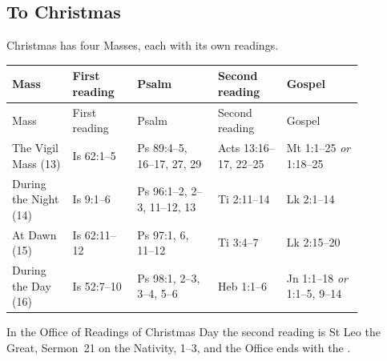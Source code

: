 \subsection{To Christmas}

Christmas has four Masses, each with its own readings.

{\footnotesize
\setlength{\tabcolsep}{4pt}
\begin{longtable}{@{}>{\raggedright\arraybackslash}p{0.15\linewidth}>{\raggedright\arraybackslash}p{0.16\linewidth}>{\raggedright\arraybackslash}p{0.20\linewidth}>{\raggedright\arraybackslash}p{0.17\linewidth}>{\raggedright\arraybackslash}p{0.19\linewidth}@{}}
\toprule
Mass & First reading & Psalm & Second reading & Gospel\\
\midrule
\endfirsthead
\toprule
Mass & First reading & Psalm & Second reading & Gospel\\
\midrule
\endhead
The Vigil Mass (13) & Is 62:1--5 & Ps 89:4--5, 16--17, 27, 29 & Acts 13:16--17, 22--25 & Mt 1:1--25 \textit{or} 1:18--25\\
\addlinespace
During the Night (14) & Is 9:1--6 & Ps 96:1--2, 2--3, 11--12, 13 & Ti 2:11--14 & Lk 2:1--14\\
\addlinespace
At Dawn (15) & Is 62:11--12 & Ps 97:1, 6, 11--12 & Ti 3:4--7 & Lk 2:15--20\\
\addlinespace
During the Day (16) & Is 52:7--10 & Ps 98:1, 2--3, 3--4, 5--6 & Heb 1:1--6 & Jn 1:1--18 \textit{or} 1:1--5, 9--14\\
\bottomrule
\end{longtable}
}

In the Office of Readings of Christmas Day the second reading is St Leo the Great, Sermon~21 on
the Nativity, 1--3, and the Office ends with the .
